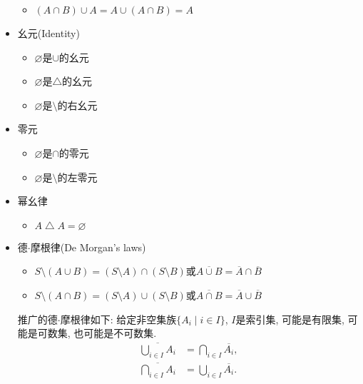 \begin{theorem}
\begin{itemize}
\begin{itemize}
				\item[] $(A\cap B)\cup A=A\cup (A\cap B)=A$
			\end{itemize}
		\item 幺元(Identity)
			\begin{itemize}
				\item[] \quad $\varnothing$是$\cup$的幺元
				\item[] \quad $\varnothing$是$\bigtriangleup$的幺元
				\item[] \quad $\varnothing$是$\setminus$的右幺元
			\end{itemize}
		\item 零元
			\begin{itemize}
				\item[] \quad $\varnothing$是$\cap$的零元
				\item[] \quad $\varnothing$是$\setminus$的左零元
			\end{itemize}
		\item 幂幺律
			\begin{itemize}
				\item[] $A\bigtriangleup A=\varnothing$
			\end{itemize}
		\item 德$\cdot$摩根律(De Morgan's laws)
			\begin{itemize}
				\item[] $S\setminus (A\cup B)=(S\setminus A)\cap (S\setminus B)$\quad 或\quad $\overline{ A\cup B}=\overline A\cap \overline B$
				\item[] $S\setminus (A\cap B)=(S\setminus A)\cup (S\setminus B)$\quad 或\quad $\overline{ A\cap B}=\overline A\cup \overline B$
			\end{itemize}
			推广的德$\cdot$摩根律如下:
			给定非空集族$\{A_i\mid i\in I\}$, $I$是索引集, 可能是有限集, 可能是可数集, 也可能是不可数集.
			\begin{align*}
				\overline{\bigcup_{i\in I} A_i} & =\bigcap_{i\in I}\overline{A_i}, \\
				\overline{\bigcap_{i\in I} A_i} & =\bigcup_{i\in I}\overline{A_i}.
			\end{align*}
	\end{itemize}
\end{theorem}

